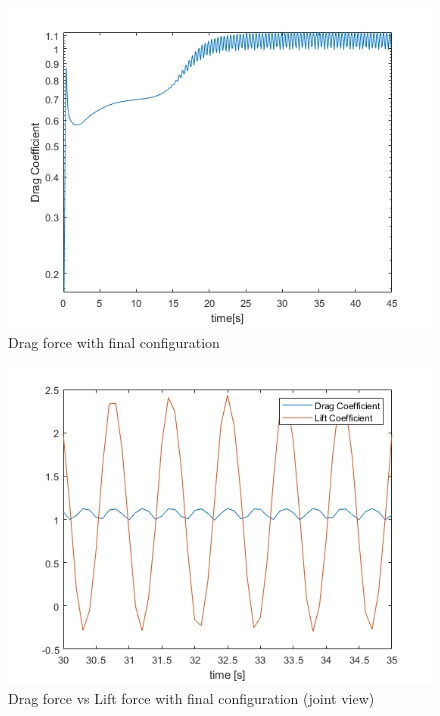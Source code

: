 \documentclass[12pt]{article}
\begin{document}
               \begin{figure}[!ht]
                \includegraphics[width=\textwidth]{drag_Federica.png}
                \centering
                \caption{Drag force with final configuration}
                \label{fig:drag_f}
        \end{figure}
     
            \begin{figure}[!ht]
                \includegraphics[width=\textwidth]{drag_vs_lift_Federica.png}
                \centering
                \caption{Drag force vs Lift force with final configuration (joint view)}
                \label{fig:drag_vsl1}
        \end{figure}
     
\end{document}
